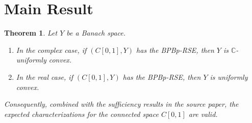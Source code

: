 \documentclass[11pt]{article}
\newtheorem{theorem}{Theorem}
\newcommand{\C}{\mathbb C}
\begin{document}
\section*{Main Result}

\begin{theorem}
Let $Y$ be a Banach space.
\begin{enumerate}
\item In the complex case, if $(C[0,1],Y)$ has the BPBp-RSE, then $Y$ is
$\C$-uniformly convex.
\item In the real case, if $(C[0,1],Y)$ has the BPBp-RSE, then $Y$ is
uniformly convex.
\end{enumerate}
Consequently, combined with the sufficiency results in the source paper, the
expected characterizations for the connected space $C[0,1]$ are valid.
\end{theorem}
\end{document}
